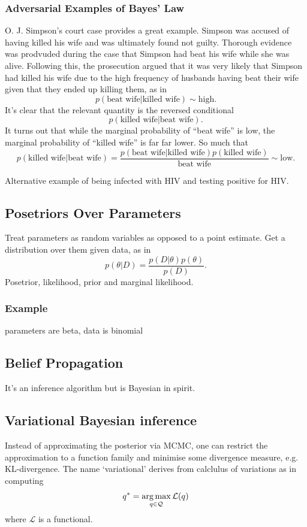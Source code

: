 \documentclass[11pt]{article}
\begin{document}
\begin{appendices}
\subsubsection*{Adversarial Examples of Bayes' Law}
O. J. Simpson's court case provides a great example. Simpson was accused of having killed his wife and was ultimately found not guilty. Thorough evidence was prodvuded during the case that Simpson had beat his wife while she was alive. Following this, the prosecution argued that it was very likely that Simpson had killed his wife due to the high frequency of husbands having beat their wife given that they ended up killing them, as in
$$
p(\text{beat wife}|\text{killed wife})\sim\text{high}.
$$
It's clear that the relevant quantity is the reversed conditional
$$
p(\text{killed wife}|\text{beat wife}).
$$
It turns out that while the marginal probability of ``beat wife'' is low, the marginal probability of ``killed wife'' is far far lower. So much that
$$
p(\text{killed wife}|\text{beat wife})
=
\frac{p(\text{beat wife}|\text{killed wife})p(\text{killed wife})}{\text{beat wife}}\sim\text{low}.
$$

Alternative example of being infected with HIV and testing positive for HIV.

\subsection{Posetriors Over Parameters}
Treat parameters as random variables as opposed to a point estimate. Get a distribution over them given data, as in
$$
p(\theta|D)
=
\frac{p(D|\theta)p(\theta)}{p(D)}.
$$
Posetrior, likelihood, prior and marginal likelihood.

\subsubsection*{Example}
parameters are beta, data is binomial

\subsection{Belief Propagation}
It's an inference algorithm but is Bayesian in spirit.

\subsection{Variational Bayesian inference}
Instead of approximating the posterior via MCMC, one can restrict the approximation to a function family and minimise some divergence measure, e.g. KL-divergence. The name `variational' derives from calclulus of variations as in computing
$$
q^*
=
\operatorname*{arg\,max}_{q\in\mathcal{Q}}\mathcal{L}(q)
$$
where $\mathcal{L}$ is a functional.


\end{appendices}
\end{document}
